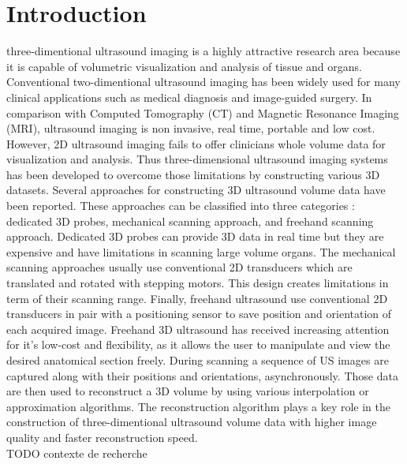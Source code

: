 \documentclass[12pt,journal,compsoc]{IEEEtran}
\begin{document}
\section{Introduction}

 three-dimentional ultrasound imaging is a highly attractive research area because it is capable of volumetric visualization and analysis of tissue and organs. Conventional two-dimentional ultrasound imaging has been widely used for many clinical applications such as medical diagnosis and image-guided surgery. In comparison with Computed Tomography (CT) and Magnetic Resonance Imaging (MRI), ultrasound imaging is non invasive, real time, portable and low cost. However, 2D ultrasound imaging fails to offer clinicians whole volume data for visualization and analysis. Thus three-dimensional ultrasound imaging systems has been developed to overcome those limitations by constructing various 3D datasets. Several approaches for constructing 3D ultrasound volume data have been reported. These approaches can be classified into three categories : dedicated 3D probes, mechanical scanning approach, and freehand scanning approach. 
Dedicated 3D probes can provide 3D data in real time but they are expensive and have limitations in scanning large volume organs.
The mechanical scanning approaches usually use conventional 2D transducers which are translated and rotated with stepping motors. This design creates limitations in term of their scanning range. 
Finally, freehand ultrasound use conventional 2D transducers in pair with a positioning sensor to save position and orientation of each acquired image.
Freehand 3D ultrasound has received increasing attention for it's low-cost and flexibility, as it allows the user to manipulate and view the desired anatomical section freely.
During scanning a sequence of US images are captured along with their positions and orientations, asynchronously. Those data are then used to reconstruct a 3D volume by using various interpolation or approximation algorithms. The reconstruction algorithm plays a key role in the construction of three-dimentional ultrasound volume data with higher image quality and faster reconstruction speed.\\

TODO contexte de recherche\\
\end{document}
